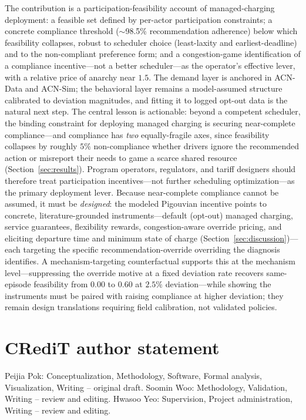 \documentclass[12pt]{article}
\begin{document}
The contribution is a participation-feasibility account of managed-charging deployment: a feasible set defined by per-actor participation constraints; a concrete compliance threshold ($\sim$98.5\% recommendation adherence) below which feasibility collapses, robust to scheduler choice (least-laxity and earliest-deadline) and to the non-compliant preference form; and a congestion-game identification of a compliance incentive---not a better scheduler---as the operator's effective lever, with a relative price of anarchy near $1.5$. The demand layer is anchored in ACN-Data and ACN-Sim; the behavioral layer remains a model-assumed structure calibrated to deviation magnitudes, and fitting it to logged opt-out data is the natural next step. The central lesson is actionable: beyond a competent scheduler, the binding constraint for deploying managed charging is securing near-complete compliance---and compliance has \emph{two} equally-fragile axes, since feasibility collapses by roughly $5\%$ non-compliance whether drivers ignore the recommended action or misreport their needs to game a scarce shared resource (Section~\ref{sec:results}). Program operators, regulators, and tariff designers should therefore treat participation incentives---not further scheduling optimization---as the primary deployment lever. Because near-complete compliance cannot be assumed, it must be \emph{designed}: the modeled Pigouvian incentive points to concrete, literature-grounded instruments---default (opt-out) managed charging, service guarantees, flexibility rewards, congestion-aware override pricing, and eliciting departure time and minimum state of charge (Section~\ref{sec:discussion})---each targeting the specific recommendation-override overriding the diagnosis identifies. A mechanism-targeting counterfactual supports this at the mechanism level---suppressing the override motive at a fixed deviation rate recovers same-episode feasibility from $0.00$ to $0.60$ at $2.5\%$ deviation---while showing the instruments must be paired with raising compliance at higher deviation; they remain design translations requiring field calibration, not validated policies.

\section*{CRediT author statement}
Peijia Pok: Conceptualization, Methodology, Software, Formal analysis, Visualization, Writing -- original draft. Soomin Woo: Methodology, Validation, Writing -- review and editing. Hwasoo Yeo: Supervision, Project administration, Writing -- review and editing.
\end{document}
